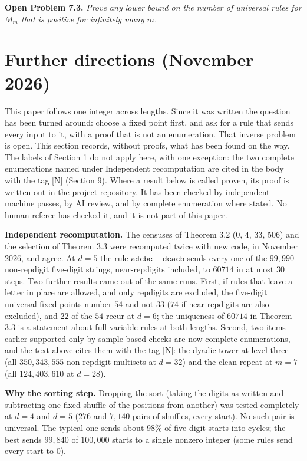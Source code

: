 \documentclass[11pt,letterpaper]{article}
\theoremstyle{paperstyle}
\theoremstyle{paperstyledef}
\theoremstyle{paperstylerem}
\begin{document}
\textbf{Open Problem 7.3.} \emph{Prove any lower bound on the number of universal rules for \(M_m\) that is positive for infinitely many \(m\).}

\section{Further directions (November 2026)}\label{further-directions-november-2026}

This paper follows one integer across lengths. Since it was written the question has been turned around: choose a fixed point first, and ask for a rule that sends every input to it, with a proof that is not an enumeration. That inverse problem is open. This section records, without proofs, what has been found on the way. The labels of Section 1 do not apply here, with one exception: the two complete enumerations named under Independent recomputation are cited in the body with the tag {[}N{]} (Section 9). Where a result below is called proven, its proof is written out in the project repository. It has been checked by independent machine passes, by AI review, and by complete enumeration where stated. No human referee has checked it, and it is not part of this paper.

\textbf{Independent recomputation.} The censuses of Theorem 3.2 (\(0\), \(4\), \(33\), \(506\)) and the selection of Theorem 3.3 were recomputed twice with new code, in November 2026, and agree. At \(d = 5\) the rule \(\mathtt{adcbe} - \mathtt{deacb}\) sends every one of the \(99{,}990\) non-repdigit five-digit strings, near-repdigits included, to \(60714\) in at most \(30\) steps. Two further results came out of the same runs. First, if rules that leave a letter in place are allowed, and only repdigits are excluded, the five-digit universal fixed points number \(54\) and not \(33\) (\(74\) if near-repdigits are also excluded), and \(22\) of the \(54\) recur at \(d = 6\); the uniqueness of \(60714\) in Theorem 3.3 is a statement about full-variable rules at both lengths. Second, two items earlier supported only by sample-based checks are now complete enumerations, and the text above cites them with the tag {[}N{]}: the dyadic tower at level three (all \(350{,}343{,}555\) non-repdigit multisets at \(d = 32\)) and the clean repeat at \(m = 7\) (all \(124{,}403{,}610\) at \(d = 28\)).

\textbf{Why the sorting step.} Dropping the sort (taking the digits as written and subtracting one fixed shuffle of the positions from another) was tested completely at \(d = 4\) and \(d = 5\) (\(276\) and \(7{,}140\) pairs of shuffles, every start). No such pair is universal. The typical one sends about \(98\%\) of five-digit starts into cycles; the best sends \(99{,}840\) of \(100{,}000\) starts to a single nonzero integer (some rules send every start to \(0\)).
\end{document}
